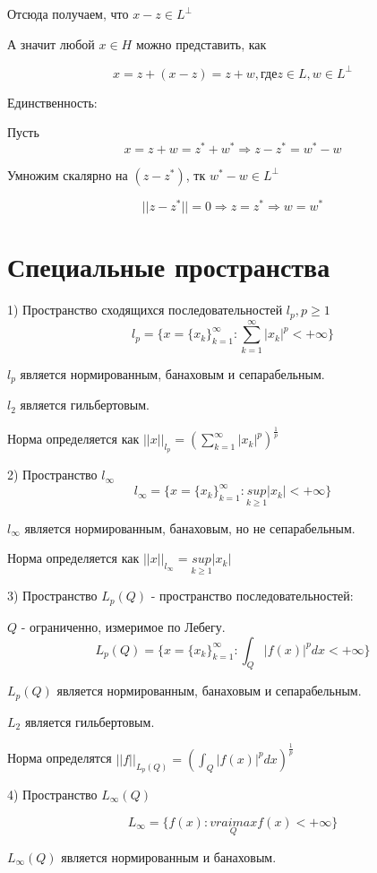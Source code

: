 \documentclass[12pt]{article}
\begin{document}
	Отсюда получаем, что $x - z \in L^{\perp}$ 
	
	А значит любой $x \in H$ можно представить, как 
	
	$$x = z + (x - z) = z + w, \text{где} z \in L, w \in L^{\perp}$$
	
Единственность:

	Пусть $$x = z + w = z^* + w^* \Rightarrow z - z^* = w^* - w$$
	
	Умножим скалярно на $(z - z^*)$, тк $w^* - w \in L^{\perp} $
	
	$$||z - z^*|| = 0 \Rightarrow z = z^* \Rightarrow  w = w^*$$
	
\section{Специальные пространства}

1) Пространство сходящихся последовательностей $l_p , p \ge 1$
	$$l_p = \{x = \{x_k\}_{k = 1}^{\infty} : \sum_{k = 1}^{\infty} |x_k|^p < +\infty \}$$

	$l_p$ является нормированным, банаховым и сепарабельным. 

	$l_2$ является гильбертовым.
	
	Норма определяется как $||x||_{l_p} = (\sum_{k = 1}^{\infty} |x_k|^p)^{\frac{1}{p}}$

2) Пространство $l_{\infty}$	
	$$l_{\infty}= \{x = \{x_k\}_{k = 1}^{\infty} : \underset{k \ge 1} {sup} |x_k| < +\infty \}$$

	$l_{\infty}$ является нормированным, банаховым, но не сепарабельным. 

	Норма определяется как $||x||_{l_{\infty}} = \underset{k \ge 1} {sup} |x_k|$

3) Пространство $L_p(Q)$ - пространство последовательностей:
	
	$Q$ - ограниченно, измеримое по Лебегу.
	$$L_p(Q)= \{x  = \{x_k\}_{k = 1}^{\infty} : \int_{Q} |f(x)|^p dx < + \infty \}$$
	
	$L_p(Q)$ является нормированным, банаховым и сепарабельным. 
	
	$L_2$ является гильбертовым.
	
	Норма определятся $||f||_{L_p(Q)} = (\int_{Q} |f(x)|^p dx) ^ \frac{1}{p}$
	
4) Пространство $L_{\infty}(Q)$

   $$L_{\infty} = \{ f(x) : \underset{Q} {vraimax} f(x) < +\infty \}$$
   
   $L_{\infty}(Q)$ является нормированным и банаховым.
   
\end{document}
